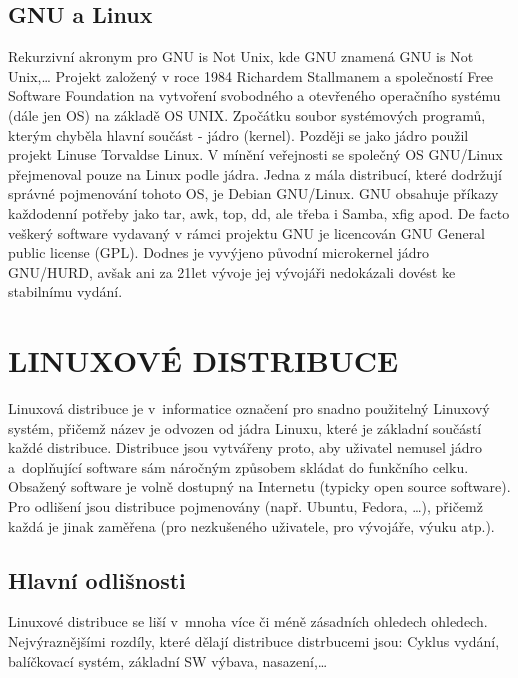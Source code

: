 \documentclass[a4paper,12pt]{article}
\newcommand{\upc}[1]{\uppercase{#1}}
\begin{document}
\subsection{GNU a Linux} 
Rekurzivní akronym pro GNU is Not Unix, kde GNU znamená GNU is Not Unix,…
Projekt založený v roce 1984 Richardem Stallmanem a společností Free Software Foundation na vytvoření svobodného a otevřeného operačního systému (dále jen OS) na základě OS UNIX. Zpočátku soubor systémových programů, kterým chyběla hlavní součást - jádro (kernel). Později se jako jádro použil projekt Linuse Torvaldse Linux. V mínění veřejnosti se společný OS GNU/Linux přejmenoval pouze na Linux podle jádra. Jedna z mála distribucí, které dodržují správné pojmenování tohoto OS, je Debian GNU/Linux.
GNU obsahuje příkazy každodenní potřeby jako tar, awk, top, dd, ale třeba i Samba, xfig apod. De facto veškerý software vydavaný v rámci projektu GNU je licencován GNU General public license (GPL). Dodnes je vyvýjeno původní microkernel jádro GNU/HURD, avšak ani za 21let vývoje jej vývojáři nedokázali dovést ke stabilnímu vydání.~\cite{GNUABCLinuxu}~\cite{GNUweb}~\cite{ROOT_HURD}


\section{\upc{Linuxové distribuce}}
Linuxová distribuce je v~informatice označení pro snadno použitelný Linuxový systém, přičemž název je odvozen od jádra Linuxu, které je základní součástí každé distribuce. Distribuce jsou vytvářeny proto, aby uživatel nemusel jádro a~doplňující software sám náročným způsobem skládat do funkčního celku. Obsažený software je volně dostupný na Internetu (typicky open source software). Pro odlišení jsou distribuce pojmenovány (např. Ubuntu, Fedora, …), přičemž každá je jinak zaměřena (pro nezkušeného uživatele, pro vývojáře, výuku atp.).\cite{WDIST}

\subsection{Hlavní odlišnosti}
Linuxové distribuce se liší v~mnoha více či méně zásadních ohledech ohledech. Nejvýraznějšími rozdíly, které dělají distribuce distrbucemi jsou: Cyklus vydání, balíčkovací systém, základní SW výbava, nasazení,…
\end{document}
